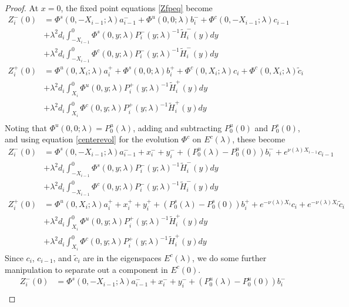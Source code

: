 \documentclass[thesis.tex]{subfiles}
\begin{document}
\begin{lemma}
\begin{proof}
At $x = 0$, the fixed point equations \eqref{Zfpeq} become
\begin{align*}
Z_i^-(0) &= \Phi^s(0, -X_{i-1}; \lambda) a_{i-1}^- + \Phi^u(0, 0; \lambda) b_i^- + \Phi^c(0, -X_{i-1}; \lambda) c_{i-1} \\
&+ \lambda^2 d_i \int_{-X_{i-1}}^0 \Phi^s(0, y; \lambda) P_i^-(y; \lambda)^{-1} \tilde{H}_i^-(y) dy \\
&+ \lambda^2 d_i \int_{-X_{i-1}}^0 \Phi^c(0, y; \lambda) P_i^-(y; \lambda)^{-1} \tilde{H}_i^-(y) dy  \\ 
Z_i^+(0) &= \Phi^u(0, X_i; \lambda) a_i^+ + \Phi^s(0, 0; \lambda) b_i^+ + \Phi^c(0, X_i; \lambda) c_i + \Phi^c(0, X_i; \lambda) \tilde{c}_i\\
&+ \lambda^2 d_i \int_{X_i}^0 \Phi^u(0, y; \lambda) P_i^+(y; \lambda)^{-1} \tilde{H}_i^+(y) dy \\
&+ \lambda^2 d_i \int_{X_i}^0 \Phi^c(0, y; \lambda) P_i^+(y; \lambda)^{-1} \tilde{H}_i^+(y) dy \\
\end{align*}
Noting that $\Phi^u(0, 0; \lambda) = P_0^u(\lambda)$, adding and subtracting $P_0^u(0)$ and $P_0^s(0)$, and using equation \eqref{centerevol} for the evolution $\Phi^c$ on $E^c(\lambda)$, these become
\begin{align*}
Z_i^-(0) &= \Phi^s(0, -X_{i-1}; \lambda) a_{i-1}^- + x_i^- + y_i^- + (P_0^u(\lambda) - P_0^u(0))b_i^- + e^{\nu(\lambda) X_{i-1}} c_{i-1} \\
&+ \lambda^2 d_i \int_{-X_{i-1}}^0 \Phi^s(0, y; \lambda) P_i^-(y; \lambda)^{-1} \tilde{H}_i^-(y) dy \\
&+ \lambda^2 d_i \int_{-X_{i-1}}^0 \Phi^c(0, y; \lambda) P_i^-(y; \lambda)^{-1} \tilde{H}_i^-(y) dy  \\ 
Z_i^+(0) &= \Phi^u(0, X_i; \lambda) a_i^+ + x_i^+ + y_i^+ + (P_0^s(\lambda) - P_0^s(0)) b_i^+ + e^{-\nu(\lambda)X_i} c_i +  e^{-\nu(\lambda)X_i} \tilde{c}_i \\
&+ \lambda^2 d_i \int_{X_i}^0 \Phi^u(0, y; \lambda) P_i^+(y; \lambda)^{-1} \tilde{H}_i^+(y) dy \\
&+ \lambda^2 d_i \int_{X_i}^0 \Phi^c(0, y; \lambda) P_i^+(y; \lambda)^{-1} \tilde{H}_i^+(y) dy 
\end{align*}
Since $c_i$, $c_{i-1}$, and $\tilde{c}_i$ are in the eigenspaces $E^c(\lambda)$, we do some further manipulation to separate out a component in $E^c(0)$.
\begin{align*}
Z_i^-(0) &= \Phi^s(0, -X_{i-1}; \lambda) a_{i-1}^- + x_i^- + y_i^- + (P_0^u(\lambda) - P_0^u(0))b_i^- \\

\end{align*}
\end{proof}
\end{lemma}
\end{document}
